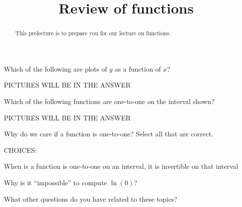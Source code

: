 \documentclass{ximera}
\title{Review of functions}
\begin{document}
\begin{abstract}
This prelecture is to prepare you for our lecture on functions.
\end{abstract}
\maketitle

\begin{question}
Which of the following are plots of $y$ as a function of $x$?

PICTURES WILL BE IN THE ANSWER

\end{question}

\begin{question}
Which of the following functions are one-to-one on the interval shown?

PICTURES WILL BE IN THE ANSWER

\end{question}

\begin{question}
Why do we care if a function is one-to-one? Select all that are
correct.

CHOICES:

When is a function is one-to-one on an interval, it is invertible on
that interval

\end{question}

\begin{question}
Why is it ``impossible'' to compute $\ln(0)$?
\end{question}

\begin{question}
What other questions do you have related to these topics?
\end{question}
\end{document}
